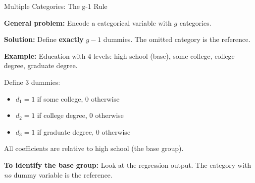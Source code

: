 \documentclass[aspectratio=169, 12pt]{beamer}
\begin{document}
\begin{frame}[shrink=20]{Multiple Categories: The g-1 Rule}

  \textbf{General problem:} Encode a categorical variable with $g$ categories.

  \medskip

  \textbf{Solution:} Define \textbf{exactly} $g-1$ dummies. The omitted category is the reference.

  \medskip

  \begin{highlightbox}
    \textbf{Example:} Education with 4 levels: high school (base), some college, college degree, graduate degree.

    Define 3 dummies:
    \begin{itemize}
      \item $d_1 = 1$ if some college, 0 otherwise
      \item $d_2 = 1$ if college degree, 0 otherwise
      \item $d_3 = 1$ if graduate degree, 0 otherwise
    \end{itemize}

    All coefficients are relative to high school (the base group).
  \end{highlightbox}

  \medskip

  \begin{keybox}
    \textbf{To identify the base group:} Look at the regression output. The category with \textit{no} dummy variable is the reference.
  \end{keybox}

\end{frame}
\end{document}
